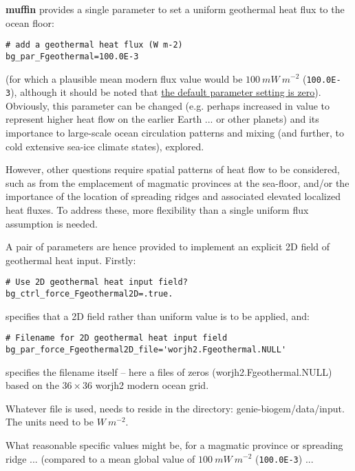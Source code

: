 \textbf{muffin} provides a single parameter to set a uniform geothermal heat flux to the ocean floor:
\vspace{-1mm}\small\begin{verbatim}
# add a geothermal heat flux (W m-2)
bg_par_Fgeothermal=100.0E-3
\end{verbatim}\normalsize\vspace{-1mm}
(for which a plausible mean modern flux value would be \(100\:mW\:m^{-2}\) (\texttt{100.0E-3}), although it should be noted that \uline{the default parameter setting is zero}). Obviously, this parameter can be changed (e.g. perhaps increased in value to represent higher heat flow on the earlier Earth ... or other planets) and its importance to large-scale ocean circulation patterns and mixing (and further, to cold extensive sea-ice climate states), explored.

\vspace{1mm}
\noindent However, other questions require spatial patterns of heat flow to be considered, such as from the emplacement of magmatic provinces at the sea-floor, and/or the importance of the location of spreading ridges and associated elevated localized heat fluxes. To address these, more flexibility than a single uniform flux assumption is needed.

A pair of parameters are hence provided to implement an explicit 2D field of geothermal heat input. Firstly:
\vspace{-1mm}\small\begin{verbatim}
# Use 2D geothermal heat input field?
bg_ctrl_force_Fgeothermal2D=.true.
\end{verbatim}\normalsize\vspace{-1mm}
specifies that a 2D field rather than uniform value is to be applied, and:
\vspace{-1mm}\small\begin{verbatim}
# Filename for 2D geothermal heat input field
bg_par_force_Fgeothermal2D_file='worjh2.Fgeothermal.NULL'
\end{verbatim}\normalsize\vspace{-1mm}
specifies the filename itself -- here a files of zeros (\textsf{\footnotesize worjh2.Fgeothermal.NULL}) based on the \(36\times36\) \textsf{\footnotesize worjh2} modern ocean grid. 

Whatever file is used, needs to reside in the directory: \textsf{\footnotesize genie-biogem/data/input}. The units need to be \(W\:m^{-2}\).

What reasonable specific values might be, for a magmatic province or spreading ridge ... (compared to a mean global value of \(100\:mW\:m^{-2}\) (\texttt{100.0E-3}) ... 

